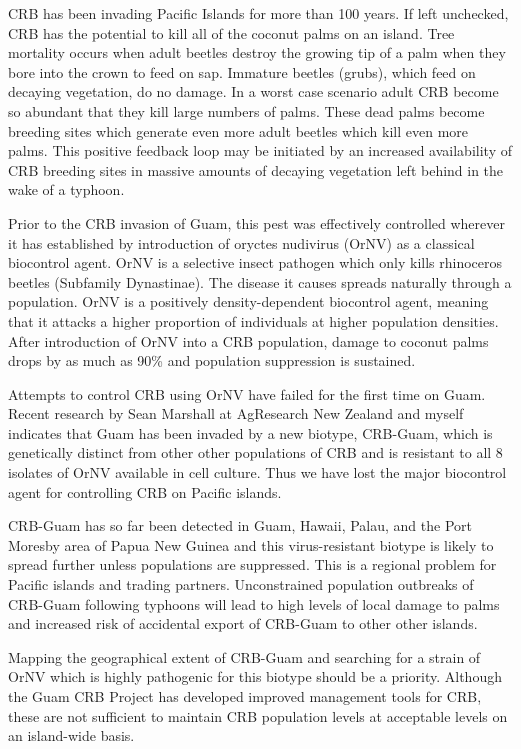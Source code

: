 \documentclass[12pt,oneside,english]{scrbook}
\begin{document}
CRB has been invading Pacific Islands for more than 100 years. If left unchecked, CRB has the potential to kill all of the coconut palms on an island. Tree mortality occurs when adult beetles destroy the growing tip of a palm when they bore into the crown to feed on sap. Immature beetles (grubs), which feed on decaying vegetation, do no damage. In a worst case scenario adult CRB become so abundant that they kill large numbers of palms. These dead palms become breeding sites which generate even more adult beetles which kill even more palms. This positive feedback loop may be initiated by an increased availability of CRB breeding sites in massive amounts of decaying vegetation left behind in the wake of a typhoon.

Prior to the CRB invasion of Guam, this pest was effectively controlled wherever it has established by introduction of oryctes nudivirus (OrNV) as a classical biocontrol agent. OrNV is a selective insect pathogen which only kills rhinoceros beetles (Subfamily Dynastinae). The disease it causes spreads naturally through a population. OrNV is a positively density-dependent biocontrol agent, meaning that it attacks a higher proportion of individuals at higher population densities. After introduction of OrNV into a CRB population, damage to coconut palms drops by as much as 90\% and population suppression is sustained.

Attempts to control CRB using OrNV have failed for the first time on Guam. Recent research by Sean Marshall at AgResearch New Zealand and myself indicates that Guam has been invaded by a new biotype, CRB-Guam, which is genetically distinct from other other populations of CRB and is resistant to all 8 isolates of OrNV available in cell culture. Thus we have lost the major biocontrol agent for controlling CRB on Pacific islands. 

CRB-Guam has so far been detected in Guam, Hawaii, Palau, and the Port Moresby area of Papua New Guinea and this virus-resistant biotype is likely to spread further unless populations are suppressed. This is a regional problem for Pacific islands and trading partners. Unconstrained population outbreaks of CRB-Guam following typhoons will lead to high levels of local damage to palms and increased risk of accidental export of CRB-Guam to other other islands. 

Mapping the geographical extent of CRB-Guam and searching for a strain of OrNV which is highly pathogenic for this biotype should be a priority. Although the Guam CRB Project has developed improved management tools for CRB, these are not sufficient to maintain CRB population levels at acceptable levels on an island-wide basis.  
\end{document}
